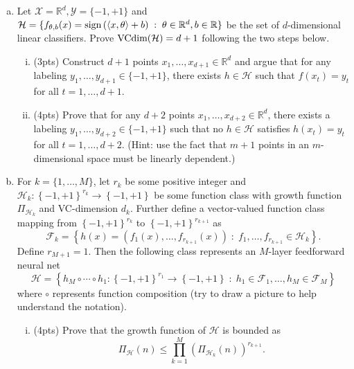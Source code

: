 \documentclass[11pt]{article}
\newcommand{\calX}{{\mathcal{X}}}
\newcommand{\calY}{{\mathcal{Y}}}
\newcommand{\calH}{{\mathcal{H}}}
\newcommand{\calF}{{\mathcal{F}}}
\newcommand{\VC}{{\text{\rm VCdim}}}
\newcommand{\blue}[1]{{\color{blue}#1}}
\newcommand{\R}{\mathbb{R}}
\newcommand{\cbr}[1]{\left\{#1\right\}}
\newcommand{\rbr}[1]{\left(#1\right)}
\newcommand{\inner}[2]{\left\langle #1,#2 \right\rangle}
\newcommand{\sign}{{\text{\rm sign}}}
\begin{document}
\begin{enumerate}[(a)]
\vspace{5pt}
\item 
Let $\calX = \R^d, \calY = \{-1,+1\} $ and $\calH = \{f_{\theta,b}(x) =  \sign\rbr{\inner{x}{\theta}+b} \;:\; \theta \in \R^d, b \in \R\}$ be the set of $d$-dimensional linear classifiers.
Prove $\VC(\calH) = d+1$ following the two steps below.

\begin{enumerate}[(i)]
\item (\blue{3pts}) 
Construct $d+1$ points $x_1, \ldots, x_{d+1} \in \R^d$ and argue that for any labeling $y_1, \ldots, y_{d+1} \in \{-1,+1\}$, there exists $h \in \calH$ such that $f(x_t) = y_t$ for all $t = 1, \ldots, d+1$. \\

\item (\blue{4pts}) 
Prove that for any $d+2$ points $x_1, \ldots, x_{d+2} \in \R^d$, there exists a labeling $y_1, \ldots, y_{d+2} \in \{-1,+1\}$ such that no $h\in\calH$ satisfies $h(x_t) = y_t$ for all $t = 1, \ldots, d+2$. 
(Hint: use the fact that $m+1$ points in an $m$-dimensional space must be linearly dependent.)\\

\end{enumerate}

\vspace{5pt}
\item For $k=\{1, \ldots, M\}$, let $r_k$ be some positive integer and $\calH_k: \cbr{-1,+1}^{r_k} \rightarrow \cbr{-1,+1}$ be some function class with growth function $\Pi_{\calH_k}$ and VC-dimension $d_k$.
Further define a vector-valued function class mapping from $\cbr{-1,+1}^{r_k}$ to $\cbr{-1,+1}^{r_{k+1}}$ as
\[
\calF_k = \cbr{h(x) = (f_1(x), \ldots, f_{r_{k+1}}(x)) \;:\; f_1, \ldots, f_{r_{k+1}} \in \calH_k}.
\]
Define $r_{M+1} = 1$.
Then the following class represents an $M$-layer feedforward neural net
\[
\calH = \cbr{h_M \circ \cdots \circ h_1 :  \cbr{-1,+1}^{r_1} \rightarrow \cbr{-1,+1}\;:\; h_1 \in \calF_1, \ldots, h_M \in \calF_M}
\]
where $\circ$ represents function composition (try to draw a picture to help understand  the notation).

\begin{enumerate}[(i)]
\item (\blue{4pts}) 
Prove that the growth function of $\calH$ is bounded as \[\Pi_\calH(n) \leq \prod_{k=1}^M \rbr{\Pi_{\calH_k}(n)}^{r_{k+1}}.\] 


\end{enumerate}
\end{enumerate}
\end{document}
